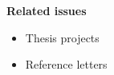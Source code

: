 \begin{frame}
	\begin{figure}
	\end{figure}
\end{frame}
\begin{frame}
	\textbf{Related issues}\vspace{0.3cm}

	\begin{itemize}\setlength\itemsep{1em}
	\item Thesis projects
	\item Reference letters
	\end{itemize}
\end{frame}
